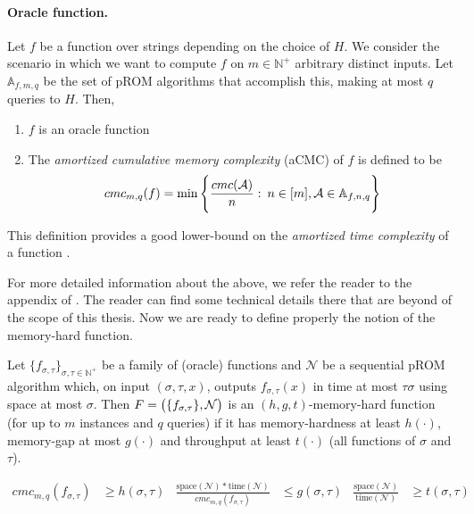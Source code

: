 \paragraph{Oracle function.} Let $f$ be a function over strings depending on the choice of $H$. We consider the scenario in which we want to compute $f$ on $m \in \mathbb{N}^{+}$ arbitrary distinct inputs.
Let $\mathbb{A}_{f,m,q}$ be the set of pROM algorithms that accomplish this, making at most $q$ queries to
$H$. Then,

\begin{enumerate}[label=(\alph*)]
  \item $f$ is an oracle function \\

  \item The \emph{amortized cumulative memory complexity} (aCMC) of $f$ is defined to be
  \begin{equation} \nonumber
      cmc_{m,q}(f) = \min \Bigg{\{} \frac{cmc(\mathcal{A})}{n} : \: n \in [m], \mathcal{A} \in \mathbb{A}_{f,n,q} \Bigg{\}}
  \end{equation}
\end{enumerate}
This definition provides a good lower-bound on the \emph{amortized time complexity} of a function \cite{Alwen:2015:HPC:2746539.2746622}.

For more detailed information about the above, we refer the reader to the appendix of \cite{cryptoeprint:2016:875}. The reader can find some technical details there that are beyond of the scope of this thesis. Now we are ready to define properly the notion of the memory-hard function.


\begin{definition} \label{Memhard1}
  Let $\{ f_{\sigma, \tau} \}_{\sigma, \tau \in \mathbb{N}^{+}}$ be a family of (oracle) functions and $\mathcal{N}$ be a sequential pROM algorithm which, on input $(\sigma, \tau, x)$, outputs $f_{\sigma, \tau}(x)$ in time at most $\tau \sigma$ using space at most $\sigma$. Then $F=\big{(} \{ f_{\sigma,\tau} \}, \mathcal{N} \big{)}$
  is an $(h,g,t)$-memory-hard function (for up to $m$ instances and $q$ queries) if it has memory-hardness at least $h(\cdot)$, memory-gap at most $g(\cdot)$ and throughput at least $t(\cdot)$ (all functions of $\sigma$ and $\tau$).

\begin{align*}
cmc_{m,q}(f_{\sigma, \tau})&\geq h(\sigma, \tau)           &  \frac{\mbox{space}(\mathcal{N})*\mbox{time}(\mathcal{N})}{cmc_{m,q}(f_{\sigma, \tau})} &\leq g(\sigma, \tau)             &  \frac{\mbox{space}(\mathcal{N})}{\mbox{time}(\mathcal{N})} &\geq t(\sigma, \tau)\\
\end{align*}
%
\end{definition}

